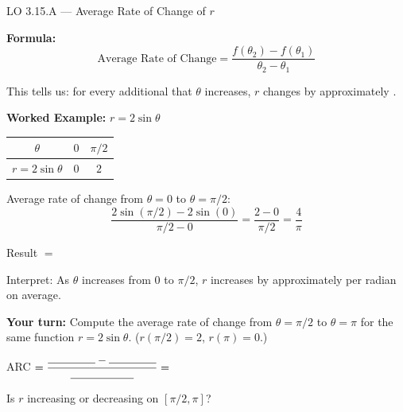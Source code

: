 \documentclass[10pt]{article}
\begin{document}
\begin{notesbox}{LO 3.15.A --- Average Rate of Change of $r$}

\textbf{Formula:}
$$\text{Average Rate of Change} = \frac{f(\theta_2) - f(\theta_1)}{\theta_2 - \theta_1}$$

This tells us: for every additional \underline{\hspace{1.5cm}} that $\theta$ increases,
$r$ changes by approximately \underline{\hspace{2cm}}.

\vspace{8pt}
\textbf{Worked Example:} $r = 2\sin\theta$

\vspace{4pt}
\renewcommand{\arraystretch}{1.5}
\begin{tabular}{|c|c|c|}
\hline
$\theta$ & $0$ & $\pi/2$ \\
\hline
$r = 2\sin\theta$ & $0$ & $2$ \\
\hline
\end{tabular}

\vspace{8pt}
Average rate of change from $\theta = 0$ to $\theta = \pi/2$:
$$\frac{2\sin(\pi/2) - 2\sin(0)}{\pi/2 - 0} = \frac{2 - 0}{\pi/2} = \frac{4}{\pi}$$

Result $= $ \underline{\hspace{3cm}}

\vspace{6pt}
Interpret: As $\theta$ increases from $0$ to $\pi/2$, $r$ increases by approximately
\underline{\hspace{1.8cm}} per radian on average.

\vspace{8pt}
\textbf{Your turn:} Compute the average rate of change from $\theta = \pi/2$ to $\theta = \pi$
for the same function $r = 2\sin\theta$. ($r(\pi/2) = 2$, $r(\pi) = 0$.)

\vspace{6pt}
ARC $= \dfrac{\rule{1.5cm}{0.4pt} - \rule{1.5cm}{0.4pt}}{\rule{2cm}{0.4pt}} = $ \underline{\hspace{3cm}}

\vspace{4pt}
Is $r$ increasing or decreasing on $[\pi/2, \pi]$? \underline{\hspace{3cm}}

\end{notesbox}
\end{document}
